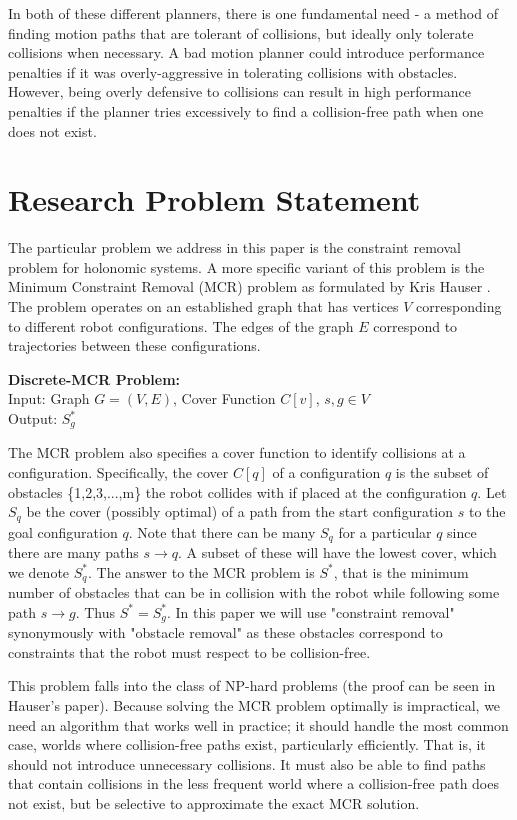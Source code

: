 In both of these different planners, there is one fundamental need - a method of finding motion paths that are tolerant of collisions, but ideally only tolerate collisions when necessary. A bad motion planner could introduce performance penalties if it was overly-aggressive in tolerating collisions with obstacles. However, being overly defensive to collisions can result in high performance penalties if the planner tries excessively to find a collision-free path when one does not exist. 

\section{Research Problem Statement} \label{intro:statement}
The particular problem we address in this paper is the constraint removal problem for holonomic systems. A more specific variant of this problem is the Minimum Constraint Removal (MCR) problem as formulated by Kris Hauser \cite{hauser:mcr}. The problem operates on an established graph that has vertices $V$ corresponding to different robot configurations. The edges of the graph $E$ correspond to trajectories between these configurations. 

\begin{mdframed}
{\bf{Discrete-MCR Problem:}}\\
Input: Graph $G = (V,E)$, Cover Function $C[v]$, $s,g \in V$ \\
Output: $S^{*}_g$
\end{mdframed}

The MCR problem also specifies a cover function to identify collisions at a configuration. Specifically, the cover $C[q]$ of a configuration $q$ is the subset of obstacles \{1,2,3,...,m\} the robot collides with if placed at the configuration $q$. Let $S_q$ be the cover (possibly optimal) of a path from the start configuration $s$ to the goal configuration $q$. Note that there can be many $S_q$ for a particular $q$ since there are many paths $s \rightarrow q$. A subset of these will have the lowest cover, which we denote $S^{*}_q$. The answer to the MCR problem is $S^{*}$, that is the minimum number of obstacles that can be in collision with the robot while following some path $s \rightarrow g$. Thus $S^{*} = S^{*}_g$. In this paper we will use "constraint removal" synonymously with "obstacle removal" as these obstacles correspond to constraints that the robot must respect to be collision-free.

This problem falls into the class of NP-hard problems (the proof can be seen in Hauser's paper). Because solving the MCR problem optimally is impractical, we need an algorithm that works well in practice; it should handle the most common case, worlds where collision-free paths exist, particularly efficiently. That is, it should not introduce unnecessary collisions. It must also be able to find paths that contain collisions in the less frequent world where a collision-free path does not exist, but be selective to approximate the exact MCR solution.

